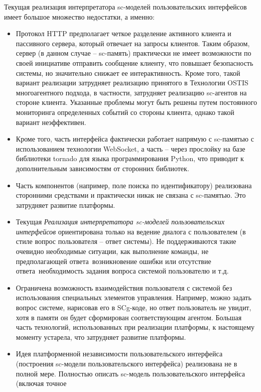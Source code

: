 Текущая реализация интерпретатора sc-моделей пользовательских интерфейсов имеет большое множество недостатки, а именно:

\begin{itemize}
    \item Протокол HTTP предполагает четкое разделение активного клиента и пассивного сервера, который отвечает
    на запросы клиентов. Таким образом, сервер (в данном случае -- sc-память) практически не имеет возможности по
    своей инициативе отправить сообщение клиенту, что повышает безопасность системы, но значительно снижает ее
    интерактивность. Кроме того, такой вариант реализации затрудняет реализацию принятого в Технологии OSTIS
    многоагентного подхода, в частности, затрудняет реализацию sc-агентов на стороне клиента. Указанные проблемы
    могут быть решены путем постоянного мониторинга определенных событий со стороны клиента, однако такой вариант
    неэффективен.
    \item Кроме того, часть интерфейса фактически работает напрямую с sc-памятью с использованием технологии
    WebSocket, а часть -- через прослойку на базе библиотеки tornado для языка программирования Python,
    что приводит к дополнительным зависимостям от сторонних библиотек.
    \item Часть компонентов (например, поле поиска по идентификатору) реализована сторонними средствами и практически
    никак не связана с sc-памятью. Это затрудняет развитие платформы.
    \item Текущая \textit{Реализация интерпретатора sc-моделей пользовательских интерфейсов} ориентирована только на
    ведение диалога с пользователем (в стиле вопрос пользователя -- ответ системы). Не поддерживаются такие очевидно
    необходимые ситуации, как выполнение команды, не предполагающей ответа~возникновение ошибки или отсутствие
    ответа~необходимость задания вопроса системой пользователю и т.д.
    \item Ограничена возможность взаимодействия пользователя с системой без использования специальных элементов
    управления. Например, можно задать вопрос системе, нарисовав его в SCg-коде, но ответ пользователь не увидит, хотя
    в памяти он будет сформирован соответствующим агентом. Большая часть технологий, использованных при реализации
    платформы, к настоящему моменту устарела, что затрудняет развитие платформы.
    \item Идея платформенной независимости пользовательского интерфейса (построения sc-модели пользовательского
    интерфейса) реализована не в полной мере. Полностью описать sc-модель пользовательского интерфейса (включая точное

\end{itemize}
